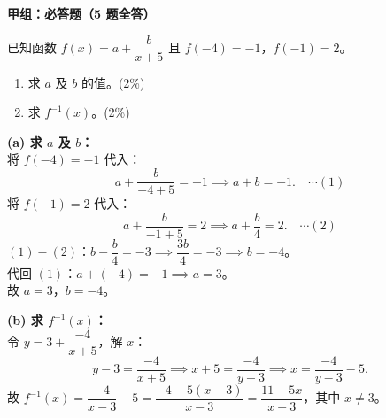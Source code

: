 \documentclass[12pt,a4paper]{exam-zh}
\begin{document}


{\bfseries 甲组：必答题（5 题全答）\par}
\vspace{0.8em}

\begin{question}
    已知函数 $f(x) = a + \dfrac{b}{x+5}$ 且 $f(-4) = -1$，$f(-1) = 2$。
    \begin{enumerate}[label=(\alph*)]
        \item 求 $a$ 及 $b$ 的值。\hfill(2\%)
        \item 求 $f^{-1}(x)$。\hfill(2\%)
    \end{enumerate}
\end{question}

\begin{solution}
    \textbf{(a) 求 $a$ 及 $b$：} \\
    将 $f(-4) = -1$ 代入：
    \[
        a + \frac{b}{-4+5} = -1 \implies a + b = -1. \quad \cdots (1)
    \]
    将 $f(-1) = 2$ 代入：
    \[
        a + \frac{b}{-1+5} = 2 \implies a + \frac{b}{4} = 2. \quad \cdots (2)
    \]
    $(1) - (2)$：$b - \dfrac{b}{4} = -3 \implies \dfrac{3b}{4} = -3 \implies b = -4$。 \\
    代回 $(1)$：$a + (-4) = -1 \implies a = 3$。 \\
    故 $a = 3$，$b = -4$。

    \textbf{(b) 求 $f^{-1}(x)$：} \\
    令 $y = 3 + \dfrac{-4}{x+5}$，解 $x$：
    \[
        y - 3 = \frac{-4}{x+5} \implies x + 5 = \frac{-4}{y-3} \implies x = \frac{-4}{y-3} - 5.
    \]
    故 $f^{-1}(x) = \dfrac{-4}{x-3} - 5 = \dfrac{-4 - 5(x-3)}{x-3} = \dfrac{11-5x}{x-3}$，其中 $x \ne 3$。
\end{solution}

\usetikzlibrary{calc}
\end{document}
